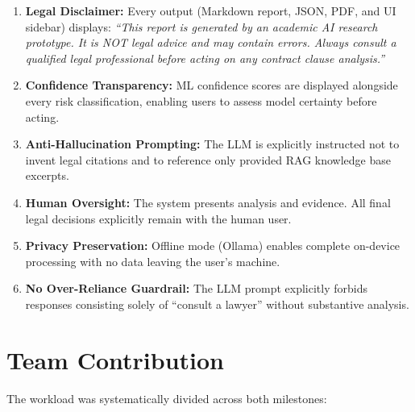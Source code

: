 \documentclass[12pt,a4paper]{article}
\begin{document}
\begin{enumerate}[leftmargin=1.5cm]
    \item \textbf{Legal Disclaimer:} Every output (Markdown report, JSON, PDF, and UI
    sidebar) displays: \textit{``This report is generated by an academic AI research
    prototype. It is NOT legal advice and may contain errors. Always consult a
    qualified legal professional before acting on any contract clause analysis.''}

    \item \textbf{Confidence Transparency:} ML confidence scores are displayed
    alongside every risk classification, enabling users to assess model certainty
    before acting.

    \item \textbf{Anti-Hallucination Prompting:} The LLM is explicitly instructed not
    to invent legal citations and to reference only provided RAG knowledge base
    excerpts.

    \item \textbf{Human Oversight:} The system presents analysis and evidence. All
    final legal decisions explicitly remain with the human user.

    \item \textbf{Privacy Preservation:} Offline mode (Ollama) enables complete
    on-device processing with no data leaving the user's machine.

    \item \textbf{No Over-Reliance Guardrail:} The LLM prompt explicitly forbids
    responses consisting solely of ``consult a lawyer'' without substantive analysis.
\end{enumerate}

\section{Team Contribution}
\label{sec:team}

The workload was systematically divided across both milestones:
\end{document}
